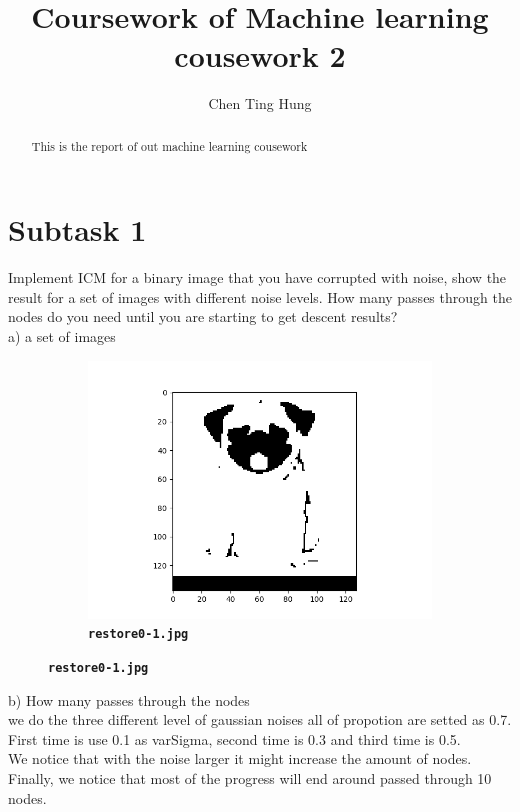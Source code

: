 \documentclass[12pt]{article}
\begin{document}
\title{Coursework of Machine learning cousework 2}



\author{Chen Ting Hung} {}
	
\maketitle

\begin{abstract}
This is the report of out machine learning cousework
\end{abstract}

\section{Subtask 1}
Implement ICM for a binary image that you have corrupted with noise, show the result for a set of images with different noise levels. How many passes through the nodes do you need until you are starting to get descent results?\\

a) a set of images\\
\begin{figure}[htb]
\centering
\begin{subfigure}[b]{.48\linewidth}
  \centering
  \includegraphics[width=\linewidth]{../result/restore0-1.png}
  \caption{\textbf{\texttt{restore0-1.jpg}}}
\end{subfigure}
\label{fig:1}
\end{figure}

b) How many passes through the nodes\\
we do the three different level of gaussian noises all of propotion are setted as 0.7.\\ 
First time is use 0.1 as varSigma, second time is 0.3 and third time is 0.5.\\
We notice that with the noise larger it might increase the amount of nodes.\\
Finally, we notice that most of the progress will end around passed through 10 nodes.\\
\end{document}
